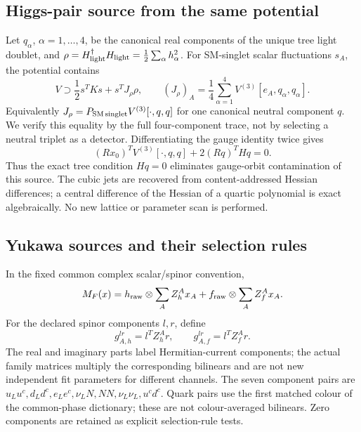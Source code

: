 \documentclass[11pt]{article}
\begin{document}
\subsection{Higgs-pair source from the same potential}
Let $q_\alpha$, $\alpha=1,\ldots,4$, be the canonical real components of
the unique tree light doublet, and
$\rho=H_{\rm light}^\dagger H_{\rm light}
=\tfrac12\sum_\alpha h_\alpha^2$.
For SM-singlet scalar fluctuations $s_A$, the potential contains
\begin{equation}
 V\supset\frac12s^TKs+s^TJ_\rho\rho,\qquad
 (J_\rho)_A=\frac14\sum_{\alpha=1}^4
 V^{(3)}[e_A,q_\alpha,q_\alpha]. \label{eq:hsource}
\end{equation}
Equivalently $J_\rho=P_{\rm SM\,singlet}V^{(3)}[\cdot,q,q]$ for one
canonical neutral component $q$. We verify this equality by the full
four-component trace, not by selecting a neutral triplet as a detector.
Differentiating the gauge identity twice gives
\begin{equation}
 (R x_0)^T V^{(3)}[\cdot,q,q]+2(Rq)^THq=0.
\end{equation}
Thus the exact tree condition $Hq=0$ eliminates gauge-orbit contamination
of this source. The cubic jets are recovered from content-addressed
Hessian differences; a central difference of the Hessian of a quartic
polynomial is exact algebraically. No new lattice or parameter scan is
performed.

\subsection{Yukawa sources and their selection rules}
In the fixed common complex scalar/spinor convention,
\begin{equation}
 M_F(x)=h_{\rm raw}\otimes\sum_A Z_h^A x_A
       +f_{\rm raw}\otimes\sum_A Z_f^A x_A.
\end{equation}
For the declared spinor components $l,r$, define
\begin{equation}
 g_{A,h}^{lr}=l^T Z_h^A r,\qquad
 g_{A,f}^{lr}=l^T Z_f^A r. \label{eq:yvertex}
\end{equation}
The real and imaginary parts label Hermitian-current components; the
actual family matrices multiply the corresponding bilinears and are
not new independent fit parameters for different channels. The seven
component pairs are $u_Lu^c,d_Ld^c,e_Le^c,\nu_LN,NN,\nu_L\nu_L,u^cd^c$.
Quark pairs use the first matched colour of the common-phase dictionary;
these are not colour-averaged bilinears. Zero components are retained as
explicit selection-rule tests.
\end{document}
